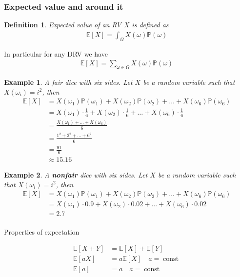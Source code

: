 \documentclass[10pt]{article}
\newtheorem*{definition}{Definition}
\newtheorem*{example}{Example}
\begin{document}
\subsubsection{Expected value and around it}

\begin{definition} Expected value of an RV $X$ is defined as
\begin{align}
\mathbb{E}[X]=\int_{\Omega} X(\omega)\mathbb{P}(\omega)
\end{align}
\end{definition}

In particular for any DRV we have
\begin{align}
\mathbb{E}[X]=\sum_{\omega\in\Omega}X(\omega)\mathbb{P}(\omega)
\end{align}

\begin{example}
A fair dice with six sides. Let $X$ be a random variable such that $X(\omega_i)=i^2$, then
\begin{align}
\mathbb{E}[X]
&=X(\omega_1)\mathbb{P}(\omega_1)+X(\omega_2)\mathbb{P}(\omega_2)+\ldots+X(\omega_6)\mathbb{P}(\omega_6)\\
&=X(\omega_1)\cdot\frac{1}{6}+X(\omega_2)\cdot\frac{1}{6}+\ldots+X(\omega_6)\cdot\frac{1}{6}\\
&=\frac{X(\omega_1)+\ldots+X(\omega_6)}{6}\\
&=\frac{1^2+2^2+\ldots+6^2}{6}\\
&=\frac{91}{6}\\
&\approx 15.16
\end{align}
\end{example} 

\begin{example}
A \textbf{nonfair} dice with six sides. Let $X$ be a random variable such that $X(\omega_i)=i^2$, then
\begin{align}
\mathbb{E}[X]
&=X(\omega_1)\mathbb{P}(\omega_1)+X(\omega_2)\mathbb{P}(\omega_2)+\ldots+X(\omega_6)\mathbb{P}(\omega_6)\\
&=X(\omega_1)\cdot 0.9+X(\omega_2)\cdot 0.02+\ldots+X(\omega_6)\cdot 0.02\\
&=2.7\\
\end{align}
\end{example} 

Properties of expectation

\begin{align}
\mathbb{E}[X+Y]&=\mathbb{E}[X]+\mathbb{E}[Y]\\
\mathbb{E}[aX]&=a\mathbb{E}[X]\quad a=\operatorname{const}\\
\mathbb{E}[a]&=a\quad a=\operatorname{const}
\end{align}
\end{document}
